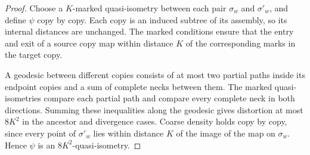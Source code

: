 \begin{proof}
\leanok
{}
Choose a $K$-marked quasi-isometry between each pair $\sigma_w$ and $\sigma'_w$, and define
$\psi$ copy by copy. Each copy is an induced subtree of its assembly, so its internal distances
are unchanged. The marked conditions ensure that the entry and exit of a source copy map within
distance $K$ of the corresponding marks in the target copy.

A geodesic between different copies consists of at most two partial paths inside its endpoint
copies and a sum of complete necks between them. The marked quasi-isometries compare each partial
path and compare every complete neck in both directions. Summing these inequalities along the
geodesic gives distortion at most $8K^2$ in the ancestor and divergence cases. Coarse density
holds copy by copy, since every point of $\sigma'_w$ lies within distance $K$ of the image of the
map on $\sigma_w$. Hence $\psi$ is an $8K^2$-quasi-isometry.
\end{proof}
